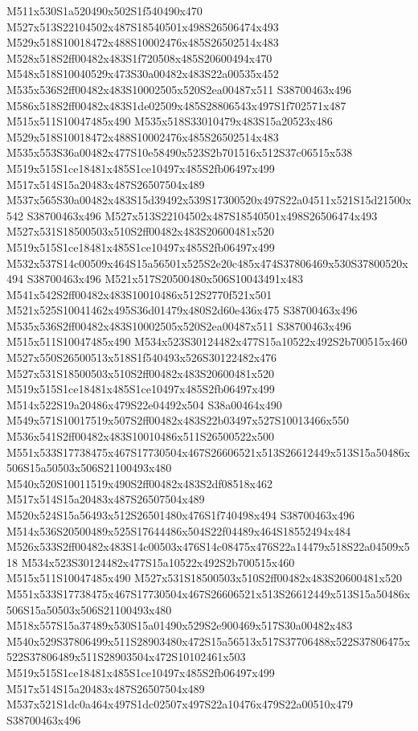 \documentclass{article}
\begin{document}
\begin{multicols}{2}
M511x530S1a520490x502S1f540490x470 M527x513S22104502x487S18540501x498S26506474x493 M529x518S10018472x488S10002476x485S26502514x483 M528x518S2ff00482x483S1f720508x485S20600494x470 M548x518S10040529x473S30a00482x483S22a00535x452 M535x536S2ff00482x483S10002505x520S2ea00487x511 S38700463x496 M586x518S2ff00482x483S1de02509x485S28806543x497S1f702571x487 M515x511S10047485x490 M535x518S33010479x483S15a20523x486 M529x518S10018472x488S10002476x485S26502514x483 M535x553S36a00482x477S10e58490x523S2b701516x512S37c06515x538 M519x515S1ce18481x485S1ce10497x485S2fb06497x499 M517x514S15a20483x487S26507504x489 M537x565S30a00482x483S15d39492x539S17300520x497S22a04511x521S15d21500x542 S38700463x496 M527x513S22104502x487S18540501x498S26506474x493 M527x531S18500503x510S2ff00482x483S20600481x520 M519x515S1ce18481x485S1ce10497x485S2fb06497x499 M532x537S14c00509x464S15a56501x525S2e20c485x474S37806469x530S37800520x494 S38700463x496 M521x517S20500480x506S10043491x483 M541x542S2ff00482x483S10010486x512S2770f521x501 M521x525S10041462x495S36d01479x480S2d60e436x475 S38700463x496 M535x536S2ff00482x483S10002505x520S2ea00487x511 S38700463x496 M515x511S10047485x490 M534x523S30124482x477S15a10522x492S2b700515x460 M527x550S26500513x518S1f540493x526S30122482x476 M527x531S18500503x510S2ff00482x483S20600481x520 M519x515S1ce18481x485S1ce10497x485S2fb06497x499 M514x522S19a20486x479S22e04492x504 S38a00464x490 M549x571S10017519x507S2ff00482x483S22b03497x527S10013466x550 M536x541S2ff00482x483S10010486x511S26500522x500 M551x533S17738475x467S17730504x467S26606521x513S26612449x513S15a50486x506S15a50503x506S21100493x480 M540x520S10011519x490S2ff00482x483S2df08518x462 M517x514S15a20483x487S26507504x489 M520x524S15a56493x512S26501480x476S1f740498x494 S38700463x496 M514x536S20500489x525S17644486x504S22f04489x464S18552494x484 M526x533S2ff00482x483S14c00503x476S14c08475x476S22a14479x518S22a04509x518 M534x523S30124482x477S15a10522x492S2b700515x460 M515x511S10047485x490 M527x531S18500503x510S2ff00482x483S20600481x520 M551x533S17738475x467S17730504x467S26606521x513S26612449x513S15a50486x506S15a50503x506S21100493x480 M518x557S15a37489x530S15a01490x529S2e900469x517S30a00482x483 M540x529S37806499x511S28903480x472S15a56513x517S37706488x522S37806475x522S37806489x511S28903504x472S10102461x503 M519x515S1ce18481x485S1ce10497x485S2fb06497x499 M517x514S15a20483x487S26507504x489 M537x521S1dc0a464x497S1dc02507x497S22a10476x479S22a00510x479 S38700463x496


\end{multicols}
\end{document}
